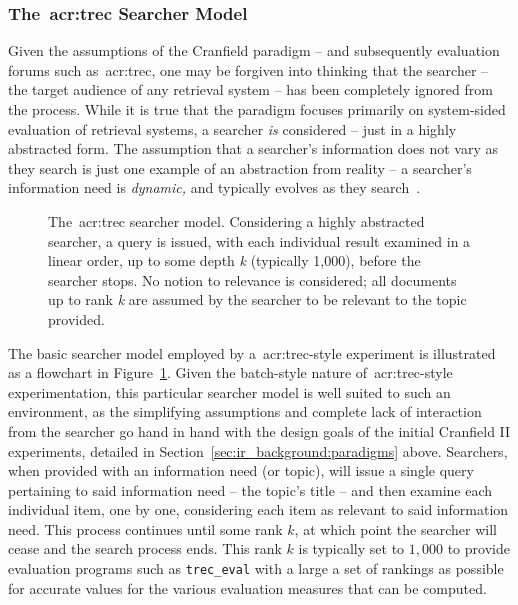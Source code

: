 \subsubsection{The~\gls{acr:trec} Searcher Model}\label{sec:ir_background:paradigms:trec:model}
Given the assumptions of the Cranfield paradigm -- and subsequently evaluation forums such as~\gls{acr:trec}, one may be forgiven into thinking that the searcher -- the target audience of any retrieval system -- has been completely ignored from the process. While it is true that the paradigm focuses primarily on system-sided evaluation of retrieval systems, a searcher \emph{is} considered -- just in a highly abstracted form. The assumption that a searcher's information does not vary as they search is just one example of an abstraction from reality -- a searcher's information need is \emph{dynamic,} and typically evolves as they search~\citep{borlund2003iir_model}.

\begin{figure}[t!]
    \centering
    \caption[\gls{acr:trec} searcher model]{The~\gls{acr:trec} searcher model. Considering a highly abstracted searcher, a query is issued, with each individual result examined in a linear order, up to some depth \emph{k} (typically 1,000), before the searcher stops. No notion to relevance is considered; all documents up to rank \emph{k} are assumed by the searcher to be relevant to the topic provided.}
    \label{fig:trec_model}
\end{figure}

The basic searcher model employed by a~\gls{acr:trec}-style experiment is illustrated as a flowchart in Figure~\ref{fig:trec_model}. Given the batch-style nature of~\gls{acr:trec}-style experimentation, this particular searcher model is well suited to such an environment, as the simplifying assumptions and complete lack of interaction from the searcher go hand in hand with the design goals of the initial Cranfield II experiments, detailed in Section~\ref{sec:ir_background:paradigms} above. Searchers, when provided with an information need (or topic), will issue a single query pertaining to said information need -- the topic's title -- and then examine each individual item, one by one, considering each item as relevant to said information need. This process continues until some rank $k$, at which point the searcher will cease and the search process ends. This rank $k$ is typically set to $1,000$ to provide evaluation programs such as \texttt{trec\_eval} with a large a set of rankings as possible for accurate values for the various evaluation measures that can be computed.

